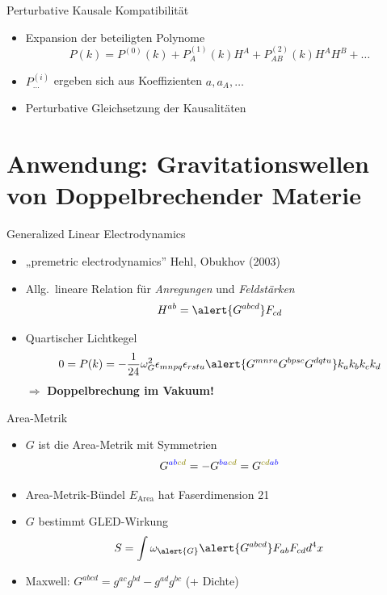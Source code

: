 \documentclass{beamer}
\begin{document}
    \begin{frame}{Perturbative Kausale Kompatibilit\"at}
        \begin{itemize}
            \item Expansion der beteiligten Polynome
            \[ P(k) = P^{(0)}(k) + P^{(1)}_A(k) H^A + P^{(2)}_{AB}(k) H^A H^B + \ldots \]
            \item $P^{(i)}_{\dots}$ ergeben sich aus Koeffizienten $a, a_A, \ldots$
            \item Perturbative Gleichsetzung der Kausalitäten
        \end{itemize}
    \end{frame}


    \section{Anwendung: Gravitationswellen von Doppelbrechender Materie}\label{sec:anwendung}

    \begin{frame}{Generalized Linear Electrodynamics}
        \begin{itemize}
            \item „premetric electrodynamics” {\scriptsize \lbrack Hehl, Obukhov (2003)\rbrack}
            \item Allg.\ lineare Relation für \textit{Anregungen} und \textit{Feldstärken}
            \[
                H^{ab} = \alert{G^{abcd}} F_{cd}
            \]
            \item Quartischer Lichtkegel \[ 0 = P(k) = -\frac{1}{24} \omega_G^2 \epsilon_{mnpq} \epsilon_{rstu} \alert{G^{mnra} G^{bpsc} G^{dqtu}} k_a k_b k_c k_d \]
            $\Rightarrow$ \textbf{Doppelbrechung im Vakuum!}
        \end{itemize}
    \end{frame}

    \begin{frame}{Area-Metrik}
        \begin{itemize}
            \item \alert{$G$} ist die \alert{Area-Metrik} mit Symmetrien
            \[ G^{\color{blue}ab\color{olive}cd} = -G^{\color{blue}ba\color{olive}cd} = G^{\color{olive}cd\color{blue}ab} \]
            \item Area-Metrik-Bündel $E_\text{Area}$ hat Faserdimension 21
            \item \alert{$G$} bestimmt GLED-Wirkung \[ S = \int \omega_{\alert{G}} \alert{G^{abcd}} F_{ab} F_{cd} d^4 x \]
            \item Maxwell: $G^{abcd} = g^{ac} g^{bd} - g^{ad} g^{bc}$ (+ Dichte)
        \end{itemize}
    \end{frame}
\end{document}
